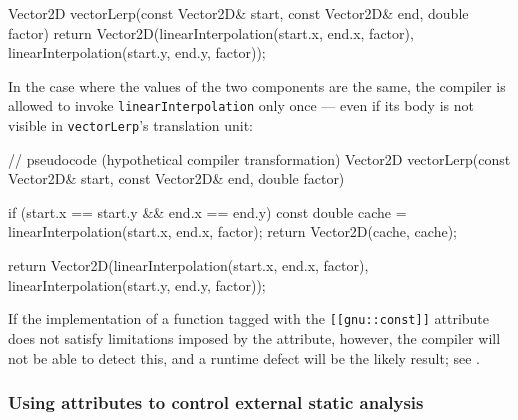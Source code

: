 \begin{emcppslisting}[language=C++]
Vector2D vectorLerp(const Vector2D& start, const Vector2D& end, double factor)
{
    return Vector2D(linearInterpolation(start.x, end.x, factor),
                    linearInterpolation(start.y, end.y, factor));
}
\end{emcppslisting}
    
\noindent In the case where the values of the two components
are the same, the compiler is allowed to invoke
\lstinline!linearInterpolation! only once --- even if its body is not
visible in \lstinline!vectorLerp!'s translation unit:

\begin{emcppslisting}[language=C++]
// pseudocode (hypothetical compiler transformation)
Vector2D vectorLerp(const Vector2D& start, const Vector2D& end, double factor)
{
    if (start.x == start.y && end.x == end.y)
    {
        const double cache = linearInterpolation(start.x, end.x, factor);
        return Vector2D(cache, cache);
    }

    return Vector2D(linearInterpolation(start.x, end.x, factor),
                    linearInterpolation(start.y, end.y, factor));
}
\end{emcppslisting}
    
\noindent If the implementation of a function tagged with the
\lstinline![[gnu::const]]! attribute does not satisfy limitations imposed by
the attribute, however, the compiler will not be able to detect this, and a runtime
defect will be the likely result; 
  see . 

\subsubsection[Using attributes to control external static analysis]{Using attributes to control external static analysis}\label{using-attributes-to-control-external-static-analysis}

